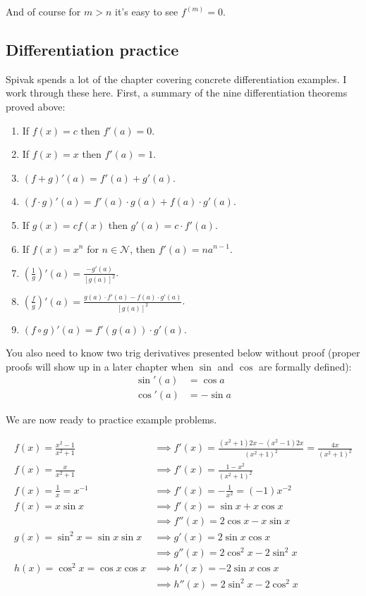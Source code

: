 And of course for $m>n$ it's easy to see $f^{(m)}=0$.

\subsection{Differentiation practice}
Spivak spends a lot of the chapter covering concrete differentiation
examples. I work through these here. First, a summary of the nine
differentiation theorems proved above:
\begin{enumerate}
\item If $f(x)=c$ then $f'(a)=0$.
\item If $f(x)=x$ then $f'(a)=1$.
\item $(f+g)'(a)=f'(a)+g'(a)$.
\item $(f\cdot g)'(a)=f'(a)\cdot g(a)+f(a)\cdot g'(a)$.
\item If $g(x)=cf(x)$ then $g'(a)=c\cdot f'(a)$.
\item If $f(x)=x^n$ for $n\in\mathcal{N}$, then $f'(a)=na^{n-1}$.
\item $\left(\frac{1}{g}\right)'(a)=\frac{-g'(a)}{{[g(a)]}^2}$.
\item $\left(\frac{f}{g}\right)'(a)=\frac{g(a)\cdot f'(a)-f(a)\cdot
    g'(a)}{[g(a)]^2}$.
\item $(f\circ g)'(a)=f'(g(a))\cdot g'(a)$.
\end{enumerate}

You also need to know two trig derivatives presented below without
proof (proper proofs will show up in a later chapter when $\sin$ and
$\cos$ are formally defined):
\begin{align*}
  \sin'(a)&=\cos a\\
  \cos'(a)&=-\sin a
\end{align*}

We are now ready to practice example problems.

\begin{align*}
f(x)=\frac{x^2-1}{x^2+1}&\implies
  f'(x)=\frac{(x^2+1)2x-(x^2-1)2x}{(x^2+1)^2}=\frac{4x}{(x^2+1)^2}\\
f(x)=\frac{x}{x^2+1}&\implies f'(x)=\frac{1-x^2}{(x^2+1)^2}\\
  f(x)=\frac{1}{x}=x^{-1}&\implies f'(x)=-\frac{1}{x^2}=(-1)x^{-2}\\
  f(x)=x\sin x&\implies f'(x)=\sin x+x\cos x\\
                        &\implies f''(x)=2\cos x-x\sin x\\
  g(x)=\sin^2x=\sin x\sin x&\implies g'(x)=2\sin x\cos x\\
                        &\implies g''(x)=2\cos^2 x-2\sin^2 x\\
  h(x)=\cos^2 x=\cos x\cos x&\implies h'(x)=-2\sin x \cos x\\
                        &\implies h''(x)=2\sin^2x-2\cos^2 x
\end{align*}

